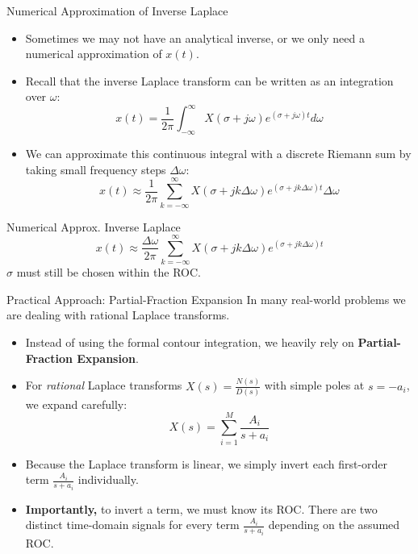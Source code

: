 \begin{frame}{Numerical Approximation of Inverse Laplace}
    \begin{itemize}
        \item Sometimes we may not have an analytical inverse, or we only need a numerical approximation of $x(t)$.
        \item Recall that the inverse Laplace transform can be written as an integration over $\omega$:
              \begin{equation*}
                  x(t) = \frac{1}{2\pi} \int_{-\infty}^{\infty} X(\sigma + j\omega) e^{(\sigma + j\omega)t} d\omega
              \end{equation*}
        \item We can approximate this continuous integral with a discrete Riemann sum by taking small frequency steps $\Delta \omega$:
              \begin{equation*}
                  x(t) \approx \frac{1}{2\pi} \sum_{k=-\infty}^{\infty} X(\sigma + jk\Delta \omega) e^{(\sigma + jk\Delta \omega)t} \Delta \omega
              \end{equation*}
    \end{itemize}

    \vspace{0.1cm}
    \begin{insightbox}{Numerical Approx. Inverse Laplace}
        \vspace{-0.2cm}
        \begin{equation*}
            x(t) \approx \frac{\Delta \omega}{2\pi} \sum_{k=-\infty}^{\infty} X(\sigma + jk\Delta \omega) e^{(\sigma + jk\Delta \omega)t}
        \end{equation*}
        $\sigma$ must still be chosen within the ROC.
    \end{insightbox}
\end{frame}

\begin{frame}{Practical Approach: Partial-Fraction Expansion}
    In many real-world problems we are dealing with rational Laplace transforms.
    \begin{itemize}
        \item Instead of using the formal contour integration, we heavily rely on \textbf{Partial-Fraction Expansion}.
        \item For \textit{rational} Laplace transforms $X(s) = \frac{N(s)}{D(s)}$ with simple poles at $s = -a_i$, we expand carefully:
              \begin{equation*}
                  X(s) = \sum_{i=1}^{M} \frac{A_i}{s + a_i}
              \end{equation*}
        \item Because the Laplace transform is linear, we simply invert each first-order term $\frac{A_i}{s+a_i}$ individually.
        \item \textbf{Importantly,} to invert a term, we must know its ROC. There are two distinct time-domain signals for every term $\frac{A_i}{s+a_i}$ depending on the assumed ROC.
    \end{itemize}
\end{frame}


